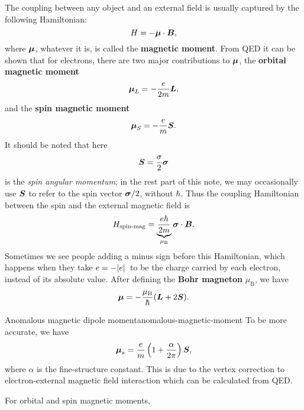 \documentclass[hyperref, a4paper]{article}
\newcommand*{\concept}[1]{{\textbf{#1}}}
\newcommand*{\muB}{\mu_{\text{B}}}
\begin{document}
The coupling between any object and an external field 
is usually captured by the following Hamiltonian:
\begin{equation}
    H = - \vb*{\mu} \cdot \vb*{B}, 
\end{equation}
where $\vb*{\mu}$, whatever it is, is called the \concept{magnetic moment}. 
From QED it can be shown that for electrons, 
there are two major contributions to $\vb*{\mu}$, 
the \concept{orbital magnetic moment} 
\begin{equation}
    \vb*{\mu}_L = - \frac{e}{2m} \vb*{L},
\end{equation}
and the \concept{spin magnetic moment} 
\begin{equation}
    \vb*{\mu}_S = - \frac{e}{m} \vb*{S}.
\end{equation}
It should be noted that here 
\begin{equation}
    \vb*{S} = \frac{\sigma}{2} \vb*{\sigma} 
\end{equation}
is the \emph{spin angular momentum}; 
in the rest part of this note, 
we may occasionally use $\vb*{S}$ to refer to 
the spin vector $\vb*{\sigma} / 2$, 
without $\hbar$.
Thus the coupling Hamiltonian between the spin and the external magnetic field is 
\begin{equation}
    H_{\text{spin-mag}} = \underbrace{\frac{e \hbar}{2 m}}_{\muB} \vb*{\sigma} \cdot \vb*{B}.
\end{equation}
Sometimes we see people adding a minus sign before this Hamiltonian,
which happens when they take $e = - \abs*{e}$
to be the charge carried by each electron, 
instead of its absolute value.
After defining the \concept{Bohr magneton} $\muB$, 
we have 
\begin{equation}
    \vb*{\mu} = - \frac{\muB}{\hbar} (\vb*{L} + 2 \vb*{S}).
\end{equation}

\begin{infobox}{Anomalous magnetic dipole moment}{anomalous-magnetic-moment}
    To be more accurate, we have 
    \begin{equation}
        \vb*{\mu}_s = \frac{e}{m} \left( 1 + \frac{\alpha}{2\pi} \right) \vb*{S},
    \end{equation}
    where $\alpha$ is the fine-structure constant. 
    This is due to the vertex correction to 
    electron-external magnetic field interaction 
    which can be calculated from QED. 
\end{infobox}

For orbital and spin magnetic moments, 
\end{document}
